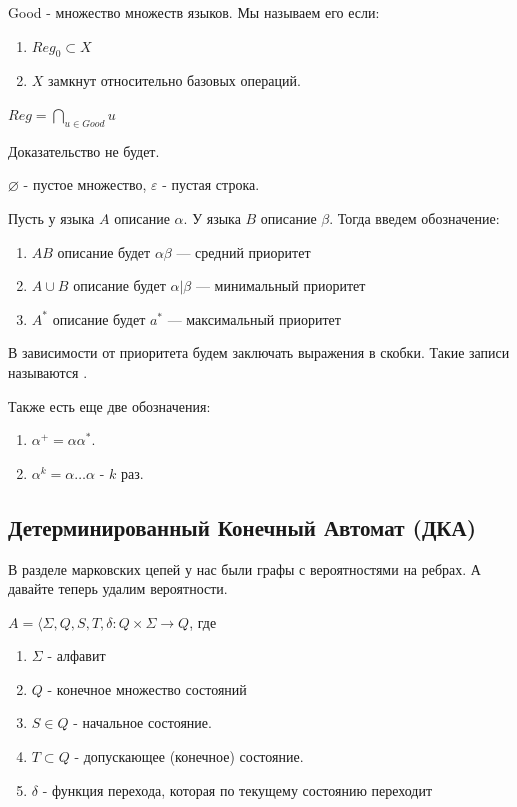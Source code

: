 Good - множество множеств языков. Мы называем его  если:
\begin{enumerate}
    \item $Reg_0 \subset X$
    \item $X$ замкнут относительно базовых операций.
\end{enumerate}

 $Reg = \bigcap\limits_{u \in Good} u$

Доказательство не будет.

$\varnothing$ - пустое множество, $\varepsilon$ - пустая строка.

Пусть у языка $A$ описание $\alpha$. У языка $B$ описание $\beta$. Тогда введем обозначение:

\begin{enumerate}
    \item $AB$ описание будет $\alpha \beta$ --- средний приоритет
    \item $A \cup B$ описание будет $\alpha | \beta$ --- минимальный приоритет
    \item $A^*$ описание будет $a^*$ --- максимальный приоритет
\end{enumerate}

В зависимости от приоритета будем заключать выражения в скобки. Такие записи называются .

Также есть еще две обозначения:
\begin{enumerate}
    \item $\alpha^+  = \alpha \alpha^* $.
    \item $\alpha^k = \alpha\ldots \alpha$ - $k$ раз.
\end{enumerate}

\subsection{Детерминированный Конечный Автомат (ДКА)}

В разделе марковских цепей у нас были графы с вероятностями на ребрах. А давайте теперь удалим вероятности. 

$A = \langle \Sigma, Q,S,T, \delta: Q \times \Sigma \rightarrow Q$, где

\begin{enumerate}
    \item $\Sigma$ - алфавит
    \item $Q$ - конечное множество состояний
    \item $S\in Q$ - начальное состояние.
    \item $T\subset Q$ - допускающее (конечное) состояние. 
    \item $\delta$ - функция перехода, которая по текущему состоянию переходит
\end{enumerate}


